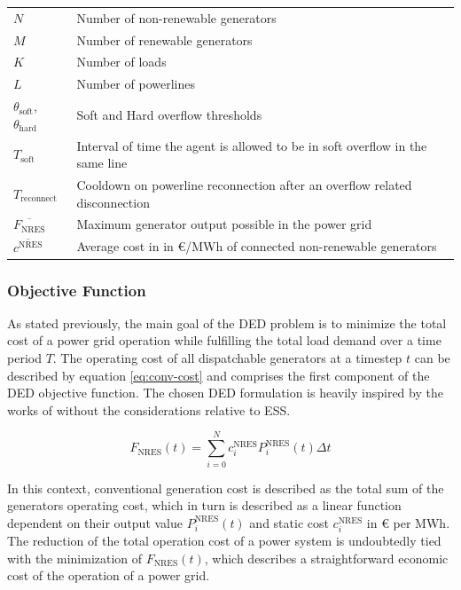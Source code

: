 \begin{table}
\begin{tabular}{lp{9.5cm}}
		$N$ & Number of non-renewable generators \\
		$M$ & Number of renewable generators \\
		$K$ & Number of loads \\
		$L$ & Number of powerlines \\
		$\theta_\text{soft}$,  $\theta_\text{hard}$ & Soft and Hard overflow thresholds \\
		$T_\text{soft}$ & Interval of time the agent is allowed to be in soft overflow in the same line \\
		$T_\text{reconnect}$ & Cooldown on powerline reconnection after an overflow related disconnection \\
		$\overline{F_\text{NRES}}$ & Maximum generator output possible in the power grid \\
		$\overline{c^\text{NRES}}$ & Average cost in in €/MWh of connected non-renewable generators \\
	\end{tabular}
\end{table}

\subsubsection{Objective Function} \label{sec:objective-func}

As stated previously, the main goal of the \ac{DED} problem is to minimize the total cost of a power grid operation while fulfilling the total load demand over a time period $T$. The operating cost of all dispatchable generators at a timestep $t$ can be described by equation \ref{eq:conv-cost} and comprises the first component of the \ac{DED} objective function. The chosen \ac{DED} formulation is heavily inspired by the works of \cite{chenScalableGraphReinforcement2023, liNovelGraphReinforcement2022, liNovelGraphReinforcement2022} without the considerations relative to \ac{ESS}. \par

\begin{equation} \label{eq:conv-cost}
	F_\text{NRES}(t) = \sum^N_{i=0} c^\text{NRES}_i P^\text{NRES}_i(t) \Delta t
\end{equation}

In this context, conventional generation cost is described as the total sum of the generators operating cost, which in turn is described as a linear function dependent on their output value $P^\text{NRES}_i(t)$ and static cost $c^\text{NRES}_i$ in € per MWh. The reduction of the total operation cost of a power system is undoubtedly tied with the minimization of $F_\text{NRES}(t)$, which describes a straightforward economic cost of the operation of a power grid. \par

